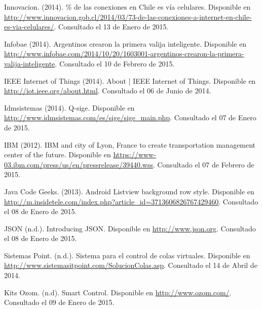 \begin{spacing}{1.0}
\begin{thebibliography}{99}
\newblock Innovacion. (2014).
\% de las conexiones en Chile es vía celulares.
\newblock Disponible en \url{http://www.innovacion.gob.cl/2014/03/73-de-las-conexiones-a-internet-en-chile-es-via-celulares/}.
\newblock Consultado el 13 de Enero de 2015.

\newblock Infobae (2014).
\newblock Argentinos crearon la primera valija inteligente.
\newblock Disponible en \url{http://www.infobae.com/2014/10/20/1603001-argentinos-crearon-la-primera-valija-inteligente}.
\newblock Consultado el 10 de Febrero de 2015.

\newblock IEEE Internet of Things (2014).
\newblock About | IEEE Internet of Things. 
\newblock Disponible en \url{http://iot.ieee.org/about.html}.
\newblock Consultado el 06 de Junio de 2014.

\newblock Idmsistemas (2014).
\newblock Q-sige.
\newblock Disponible en \url{http://www.idmsistemas.com/es/sige/sige_main.php}.
\newblock Consultado el 07 de Enero de 2015.

\newblock IBM (2012).
\newblock IBM and city of Lyon, France to create transportation management center of the future. 
\newblock Disponible en \url{https://www-03.ibm.com/press/us/en/pressrelease/39440.wss}.
\newblock Consultado el 07 de Febrero de 2015.



\newblock Java Code Geeks. (2013).
\newblock Android Listview background row style.
\newblock Disponible en \url{http://m.insidetele.com/index.php?article_id=3713606826767429460}.
\newblock Consultado el 08 de Enero de 2015.

\newblock JSON (n.d.).
\newblock Introducing JSON. 
\newblock Disponible en \url{http://www.json.org}.
\newblock Consultado el 08 de Enero de 2015.



\newblock Sistemas Point. (n.d.).
\newblock Sistema para el control de colas virtuales.
\newblock Disponible en \url{http://www.sistemasitpoint.com/SolucionColas.asp}.
\newblock Consultado el 14 de Abril de 2014.

\newblock Kits Ozom. (n.d).
\newblock Smart Control.
\newblock Disponible en \url{http://www.ozom.com/}.
\newblock Consultado el 09 de Enero de 2015.




\end{thebibliography}
\end{spacing}
